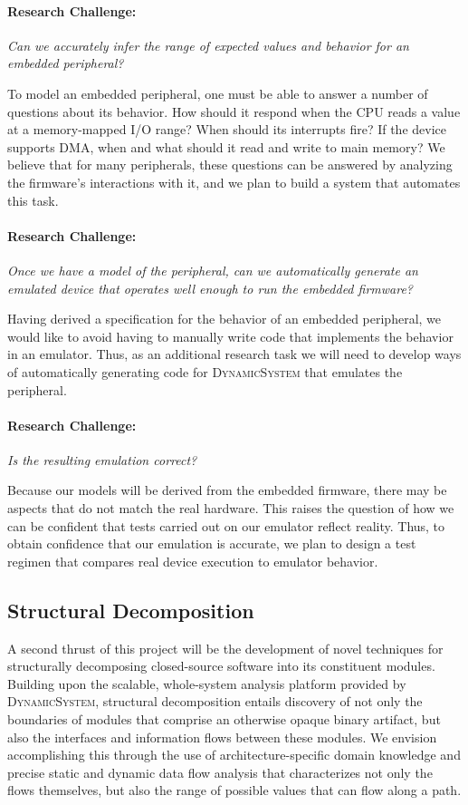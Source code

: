 \documentclass[letterpaper,twoside,11pt,headings=small]{scrartcl}
\newcommand{\dynamicsys}{\textsc{DynamicSystem}\xspace}
\newcommand{\challenge}[1]{\paragraph{Research Challenge:} \emph{#1}}
\begin{document}
\challenge{Can we accurately infer the range of expected values and
behavior for an embedded peripheral?}

To model an embedded peripheral, one must be able to answer a number of
questions about its behavior. How should it respond when the CPU reads a value
at a memory-mapped I/O range? When should its interrupts fire? If the device
supports DMA, when and what should it read and write to main memory? We
believe that for many peripherals, these questions can be answered by
analyzing the firmware's interactions with it, and we plan to build a system
that automates this task.

\challenge{Once we have a model of the peripheral, can we automatically
generate an emulated device that operates well enough to run the embedded firmware?}

Having derived a specification for the behavior of an embedded peripheral, we
would like to avoid having to manually write code that implements the behavior
in an emulator. Thus, as an additional research task we will need to develop
ways of automatically generating code for \dynamicsys that emulates the
peripheral.

\challenge{Is the resulting emulation correct?}

Because our models will be derived from the embedded firmware, there may be
aspects that do not match the real hardware. This raises the question of how
we can be confident that tests carried out on our emulator reflect reality.
Thus, to obtain confidence that our emulation is accurate, we plan to design a
test regimen that compares real device execution to emulator behavior.

\subsection{Structural Decomposition}
\label{sec:overview:structure}

A second thrust of this project will be the development of novel techniques
for structurally decomposing closed-source software into its constituent
modules.  Building upon the scalable, whole-system analysis platform provided
by \dynamicsys, structural decomposition entails discovery of not only the
boundaries of modules that comprise an otherwise opaque binary artifact, but
also the interfaces and information flows between these modules.  We envision
accomplishing this through the use of architecture-specific domain knowledge
and precise static and dynamic data flow analysis that characterizes not only
the flows themselves, but also the range of possible values that can flow along
a path.
\end{document}
